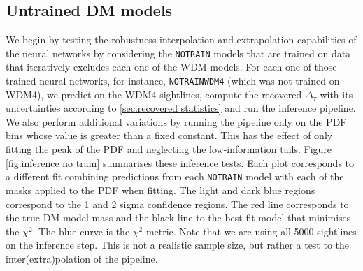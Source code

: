 \subsection{Untrained DM models}
We begin by testing the robustness interpolation and extrapolation capabilities of the neural networks by considering the \texttt{NOTRAIN} models that are trained on data that iteratively excludes each one of the WDM models. For each one of those trained neural networks, for instance, \texttt{NOTRAINWDM4} (which was not trained on WDM4), we predict on the WDM4 sightlines, compute the recovered $\Delta_\tau$ with its uncertainties according to \ref{sec:recovered statistics} and run the inference pipeline. We also perform additional variations by running the pipeline only on the PDF bins whose value is greater than a fixed constant. This has the effect of only fitting the peak of the PDF and neglecting the low-information tails. Figure \ref{fig:inference no train} summarises these inference tests. Each plot corresponds to a different fit combining predictions from each \texttt{NOTRAIN} model with each of the masks applied to the PDF when fitting. The light and dark blue regions correspond to the 1 and 2 sigma confidence regions. The red line corresponds to the true DM model mass and the black line to the best-fit model that minimises the $\chi^2$. The blue curve is the $\chi^2$ metric. Note that we are using all 5000 sightlines on the inference step. This is not a realistic sample size, but rather a test to the inter(extra)polation of the pipeline.


